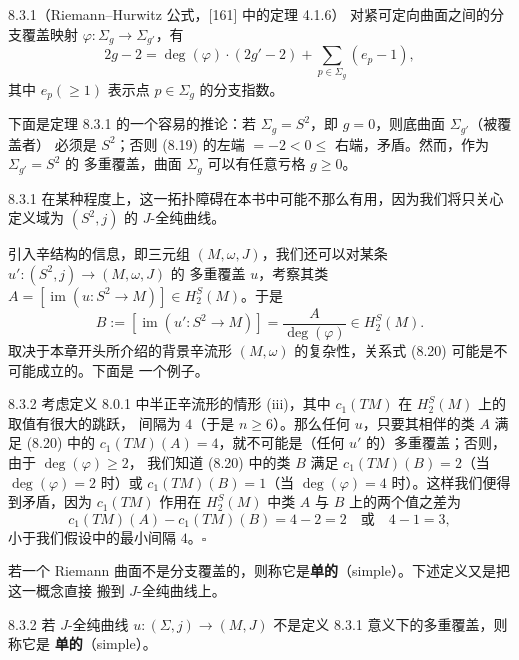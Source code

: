 \begin{wthm}{8.3.1}（Riemann--Hurwitz 公式，[161] 中的定理 4.1.6）
  对紧可定向曲面之间的分支覆盖映射 $\varphi\colon\Sigma_g\to\Sigma_{g'}$，有
  \begin{equation}\tag{8.19}
    2g-2=\deg(\varphi)\cdot(2g'-2)+\sum_{p\in\Sigma_g}(e_p-1),
  \end{equation}
  其中 $e_p(\geqslant1)$ 表示点 $p\in\Sigma_g$ 的分支指数。
\end{wthm}

下面是定理 8.3.1 的一个容易的推论：若 $\Sigma_g=S^2$，即 $g=0$，则底曲面 $\Sigma_{g'}$（被覆盖者）
必须是 $S^2$；否则 (8.19) 的左端 $=-2<0\leqslant$ 右端，矛盾。然而，作为 $\Sigma_{g'}=S^2$ 的
多重覆盖，曲面 $\Sigma_g$ 可以有任意亏格 $g\geqslant0$。

\begin{wrem}{8.3.1}
  在某种程度上，这一拓扑障碍在本书中可能不那么有用，因为我们将只关心定义域为 $(S^2,j)$ 的
  $J$-全纯曲线。
\end{wrem}

引入辛结构的信息，即三元组 $(M,\omega,J)$，我们还可以对某条 $u'\colon(S^2,j)\to(M,\omega,J)$ 的
多重覆盖 $u$，考察其类 $A=[\operatorname{im}(u\colon S^2\to M)]\in H_2^S(M)$。于是
\begin{equation}\tag{8.20}
  B:=[\operatorname{im}(u'\colon S^2\to M)]=\frac{A}{\deg(\varphi)}\in H_2^S(M).
\end{equation}
取决于本章开头所介绍的背景辛流形 $(M,\omega)$ 的复杂性，关系式 (8.20) 可能是不可能成立的。下面是
一个例子。

\begin{wexam}{8.3.2}
  考虑定义 8.0.1 中半正辛流形的情形 (iii)，其中 $c_1(TM)$ 在 $H_2^S(M)$ 上的取值有很大的跳跃，
  间隔为 $4$（于是 $n\geqslant6$）。那么任何 $u$，只要其相伴的类 $A$ 满足 (8.20) 中的
  $c_1(TM)(A)=4$，就不可能是（任何 $u'$ 的）多重覆盖；否则，由于 $\deg(\varphi)\geqslant2$，
  我们知道 (8.20) 中的类 $B$ 满足 $c_1(TM)(B)=2$（当 $\deg(\varphi)=2$ 时）或
  $c_1(TM)(B)=1$（当 $\deg(\varphi)=4$ 时）。这样我们便得到矛盾，因为 $c_1(TM)$ 作用在
  $H_2^S(M)$ 中类 $A$ 与 $B$ 上的两个值之差为
  \[
    c_1(TM)(A)-c_1(TM)(B)=4-2=2\quad\text{或}\quad4-1=3,
  \]
  小于我们假设中的最小间隔 $4$。\hfill$\square$
\end{wexam}

若一个 Riemann 曲面不是分支覆盖的，则称它是\textbf{单的}（simple）。下述定义又是把这一概念直接
搬到 $J$-全纯曲线上。

\begin{wdefn}{8.3.2}
  若 $J$-全纯曲线 $u\colon(\Sigma,j)\to(M,J)$ 不是定义 8.3.1 意义下的多重覆盖，则称它是
  \textbf{单的}（simple）。
\end{wdefn}

